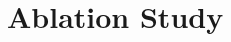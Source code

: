 \documentclass[conference]{IEEEtran}
\begin{document}
%	
%	
%	
%	
	
	
	\section{Ablation Study}
	
\end{document}
